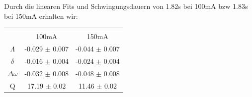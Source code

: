 \documentclass{article}
\begin{document}
Durch die linearen Fits und Schwingungsdauern von 1.82s bei 100mA bzw 1.83s bei 150mA erhalten wir: \\
\begin{center}
\begin{tabular}{|c|c|c|}
\hline \\
 & 100mA & 150mA \\
\hline $\Lambda$ & -0.029 $\pm$ 0.007 & -0.044 $\pm$ 0.007\\
 $\delta$ & -0.016 $\pm$ 0.004& -0.024 $\pm$ 0.004 \\
 $\Delta \omega$ & -0.032 $\pm$ 0.008 & -0.048 $\pm$ 0.008 \\
 Q &  17.19 $\pm$ 0.02 & 11.46 $\pm$ 0.02\\
 \hline
\end{tabular}
\end{center}
\end{document}
